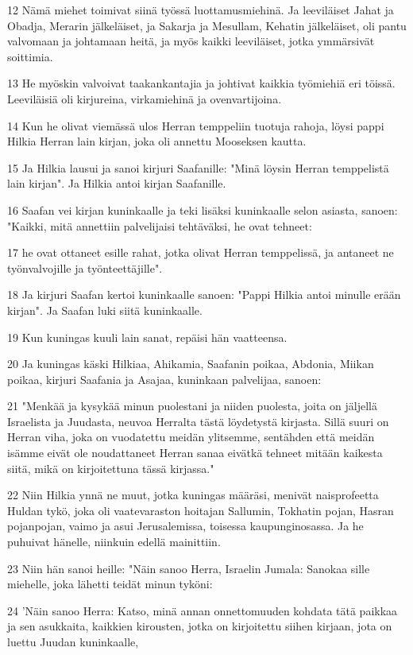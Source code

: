 \par 12 Nämä miehet toimivat siinä työssä luottamusmiehinä. Ja leeviläiset Jahat ja Obadja, Merarin jälkeläiset, ja Sakarja ja Mesullam, Kehatin jälkeläiset, oli pantu valvomaan ja johtamaan heitä, ja myös kaikki leeviläiset, jotka ymmärsivät soittimia.
\par 13 He myöskin valvoivat taakankantajia ja johtivat kaikkia työmiehiä eri töissä. Leeviläisiä oli kirjureina, virkamiehinä ja ovenvartijoina.
\par 14 Kun he olivat viemässä ulos Herran temppeliin tuotuja rahoja, löysi pappi Hilkia Herran lain kirjan, joka oli annettu Mooseksen kautta.
\par 15 Ja Hilkia lausui ja sanoi kirjuri Saafanille: "Minä löysin Herran temppelistä lain kirjan". Ja Hilkia antoi kirjan Saafanille.
\par 16 Saafan vei kirjan kuninkaalle ja teki lisäksi kuninkaalle selon asiasta, sanoen: "Kaikki, mitä annettiin palvelijaisi tehtäväksi, he ovat tehneet:
\par 17 he ovat ottaneet esille rahat, jotka olivat Herran temppelissä, ja antaneet ne työnvalvojille ja työnteettäjille".
\par 18 Ja kirjuri Saafan kertoi kuninkaalle sanoen: "Pappi Hilkia antoi minulle erään kirjan". Ja Saafan luki siitä kuninkaalle.
\par 19 Kun kuningas kuuli lain sanat, repäisi hän vaatteensa.
\par 20 Ja kuningas käski Hilkiaa, Ahikamia, Saafanin poikaa, Abdonia, Miikan poikaa, kirjuri Saafania ja Asajaa, kuninkaan palvelijaa, sanoen:
\par 21 "Menkää ja kysykää minun puolestani ja niiden puolesta, joita on jäljellä Israelista ja Juudasta, neuvoa Herralta tästä löydetystä kirjasta. Sillä suuri on Herran viha, joka on vuodatettu meidän ylitsemme, sentähden että meidän isämme eivät ole noudattaneet Herran sanaa eivätkä tehneet mitään kaikesta siitä, mikä on kirjoitettuna tässä kirjassa."
\par 22 Niin Hilkia ynnä ne muut, jotka kuningas määräsi, menivät naisprofeetta Huldan tykö, joka oli vaatevaraston hoitajan Sallumin, Tokhatin pojan, Hasran pojanpojan, vaimo ja asui Jerusalemissa, toisessa kaupunginosassa. Ja he puhuivat hänelle, niinkuin edellä mainittiin.
\par 23 Niin hän sanoi heille: "Näin sanoo Herra, Israelin Jumala: Sanokaa sille miehelle, joka lähetti teidät minun tyköni:
\par 24 'Näin sanoo Herra: Katso, minä annan onnettomuuden kohdata tätä paikkaa ja sen asukkaita, kaikkien kirousten, jotka on kirjoitettu siihen kirjaan, jota on luettu Juudan kuninkaalle,
